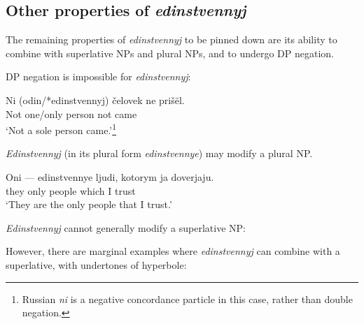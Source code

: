 \subsection{Other properties of \textit{edinstvennyj}}
The remaining properties of \textit{edinstvennyj} to be pinned down are its ability to combine with superlative NPs and plural NPs, and to undergo DP negation.

DP negation is impossible for \textit{edinstvennyj}:

\begin{exe}
	\ex \label{not-a-sole} \gll Ni (odin/*edinstvennyj) \v{c}elovek ne pri\v{s}\"{e}l.\\
	Not one/only person not came\\
	\glt `Not a sole person came.'\footnote{Russian \textit{ni} is a negative concordance particle in this case, rather than double negation.}
\end{exe}

\textit{Edinstvennyj} (in its plural form \textit{edinstvennye}) may modify a plural NP.

\begin{exe}
	\ex \label{plural-edin} \gll Oni --- edinstvennye ljudi, kotorym ja doverjaju.\\
	they {} only people which I trust\\
	\glt `They are the only people that I trust.'
\end{exe}

\textit{Edinstvennyj} cannot generally modify a superlative NP:

\begin{exe}
\end{exe}

However, there are marginal examples where \textit{edinstvennyj} can combine with a superlative, with undertones of hyperbole:

\begin{exe}
\end{exe}

